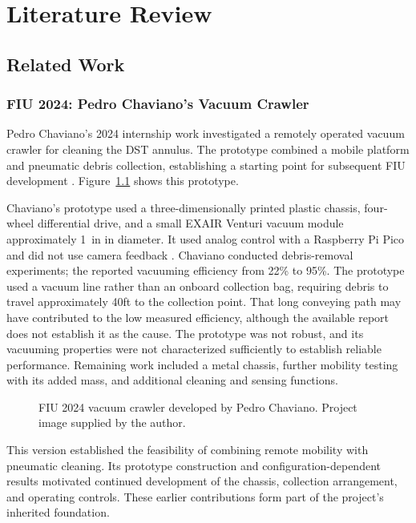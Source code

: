 \chapter{Literature Review}
\label{chap:literature}


\section{Related Work}
\label{sec:related-work}
\begingroup
\setlength{\emergencystretch}{2em}

\subsection{FIU 2024: Pedro Chaviano's Vacuum Crawler}
\label{sec:previous-fiu-crawlers}
\label{sec:fiu-2024-crawler}
Pedro Chaviano's 2024 internship work investigated a remotely operated vacuum crawler for cleaning the DST annulus. The prototype combined a mobile platform and pneumatic debris collection, establishing a starting point for subsequent FIU development \citep{chaviano2025Crawler}. Figure~\ref{fig:pedro-crawler} shows this prototype.

Chaviano's prototype used a three-dimensionally printed plastic chassis, four-wheel differential drive, and a small EXAIR Venturi vacuum module approximately 1~in in diameter. It used analog control with a Raspberry Pi Pico and did not use camera feedback \citep{chaviano2025Crawler}. Chaviano conducted debris-removal experiments; the reported vacuuming efficiency from 22\% to 95\%. The prototype used a vacuum line rather than an onboard collection bag, requiring debris to travel approximately 40ft to the collection point. That long conveying path may have contributed to the low measured efficiency, although the available report does not establish it as the cause. The prototype was not robust, and its vacuuming properties were not characterized sufficiently to establish reliable performance. Remaining work included a metal chassis, further mobility testing with its added mass, and additional cleaning and sensing functions.

\begin{figure}[H]
\centering
{}
\caption[FIU 2024 vacuum crawler: Pedro Chaviano]{FIU 2024 vacuum crawler developed by Pedro Chaviano. Project image supplied by the author.}
\label{fig:pedro-crawler}
\end{figure}

This version established the feasibility of combining remote mobility with pneumatic cleaning. Its prototype construction and configuration-dependent results motivated continued development of the chassis, collection arrangement, and operating controls. These earlier contributions form part of the project's inherited foundation.

